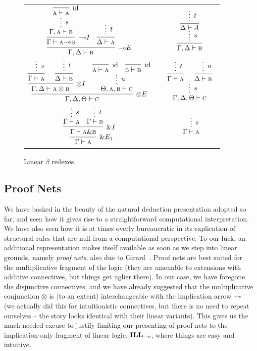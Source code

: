 \begin{figure}
	\centering
	\begin{tabularx}{0.95\textwidth}{@{}ccc@{}}
	$\infer[\li E]{\Gamma, \Delta \vdash \prop{b}}{
	\infer[\li I]{\Gamma \vdash \prop{a} \li \prop{b}}{
		\infer*[s]{\Gamma, \prop{a} \vdash \prop{b}}{
				\infer[\Ax]{\prop{a} \vdash \prop{a}}{} 
			}
		}
		&
		\infer{\Delta \vdash \prop{a}}{
			\infer*[t]{}{}
		}
	}$
	&
	\raisebox{20pt}{$\implies$}
	&
	$ 
	\infer[]{\Gamma, \Delta \vdash \prop{b}}{
		\infer*[s]{}{
		\infer[]{\Delta \vdash A}{
			\infer*[t]{}{}
		}}
	}
	$\\[\smallsep]
	$
	\infer[\otimes E]{\Gamma, \Delta, \Theta \vdash \prop{c}}{
		\infer[\otimes I]{\Gamma, \Delta \vdash \prop{a} \otimes \prop{b}}{
			\infer[]{\Gamma \vdash \prop{a}}{\infer*[s]{}{}}
			&
			\infer[]{\Delta \vdash \prop{b}}{\infer*[t]{}{}}
		}		
		&
		\infer*[u]{\Theta, \prop{a}, \prop{b} \vdash \prop{c}}{
			\infer[\Ax]{\prop{a} \vdash \prop{a}}{}
			& 
			\infer[\Ax]{\prop{b} \vdash \prop{b}}{}
		}
	}
	$
	&
	\raisebox{20pt}{$\implies$}
	&
	$
	\infer*[s]{\Gamma, \Delta, \Theta \vdash \prop{c}}{
		\infer[]{\Gamma \vdash \prop{a}}{
			\infer*[t]{}{}
		}
		&
		\infer[]{\Delta \vdash \prop{b}}{
			\infer*[u]{}{}
		}
	}
	$\\[\smallsep]
	$
	\infer[\with E_1]{\Gamma \vdash \prop{a}}{
		\infer[\with I]{\Gamma \vdash \prop{a} \with \prop{b}}{
			\infer*[s]{\Gamma \vdash \prop{a}}{}
			&
			\infer*[t]{\Gamma \vdash \prop{b}}{}
		}
	}
	$
	&
	\raisebox{10pt}{$\implies$}
	&
	$
	\infer*[s]{\Gamma \vdash \prop{a}}{}
	$
	\end{tabularx}
	\caption{Linear $\beta$ redexes.}
	\label{figure:linear_proof_reductions}
\end{figure}


\subsection{Proof Nets}
We have basked in the beauty of the natural deduction presentation adopted so far, and seen how it gives rise to a straightforward computational interpretation.
We have also seen how it is at times overly bureaucratic in its explication of structural rules that are null from a computational perspective.
To our luck, an additional representation makes itself available as soon as we step into linear grounds, namely \textit{proof nets}, also due to Girard~\cite{girard1987linear}. 
Proof nets are best suited for the multiplicative fragment of the logic (they are amenable to extensions with additive connectives, but things get uglier there).
In our case, we have foregone the disjunctive connectives, and we have already suggested that the multiplicative conjunction $\otimes$ is (to an extent) interchangeable with the implication arrow $\li$ (we actually did this for intuitionistic connectives, but there is no need to repeat ourselves -- the story looks identical with their linear variants).
This gives us the much needed excuse to justify limiting our presenting of proof nets to the implication-only fragment of linear logic, $\ILL_{\li}$, where things are easy and intuitive.

